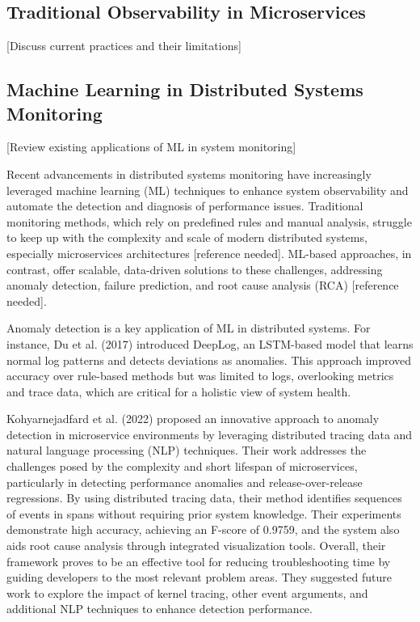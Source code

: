 \documentclass[10pt,journal,compsoc]{IEEEtran}
\begin{document}
\subsection{Traditional Observability in Microservices}
[Discuss current practices and their limitations]

\subsection{Machine Learning in Distributed Systems Monitoring}
[Review existing applications of ML in system monitoring]

Recent advancements in distributed systems monitoring have increasingly leveraged machine learning (ML) techniques to enhance system observability and automate the detection and diagnosis of performance issues. Traditional monitoring methods, which rely on predefined rules and manual analysis, struggle to keep up with the complexity and scale of modern distributed systems, especially microservices architectures [reference needed]. ML-based approaches, in contrast, offer scalable, data-driven solutions to these challenges, addressing anomaly detection, failure prediction, and root cause analysis (RCA) [reference needed].

Anomaly detection is a key application of ML in distributed systems. For instance, Du et al. (2017) \cite{du2017deeplog} introduced DeepLog, an LSTM-based model that learns normal log patterns and detects deviations as anomalies. This approach improved accuracy over rule-based methods but was limited to logs, overlooking metrics and trace data, which are critical for a holistic view of system health.

Kohyarnejadfard et al. (2022) proposed an innovative approach to anomaly detection in microservice environments by leveraging distributed tracing data and natural language processing (NLP) techniques. Their work addresses the challenges posed by the complexity and short lifespan of microservices, particularly in detecting performance anomalies and release-over-release regressions. By using distributed tracing data, their method identifies sequences of events in spans without requiring prior system knowledge. Their experiments demonstrate high accuracy, achieving an F-score of 0.9759, and the system also aids root cause analysis through integrated visualization tools. Overall, their framework proves to be an effective tool for reducing troubleshooting time by guiding developers to the most relevant problem areas. They suggested future work to explore the impact of kernel tracing, other event arguments, and additional NLP techniques to enhance detection performance\cite{kohyarnejadfard2022anomaly}.
\end{document}
